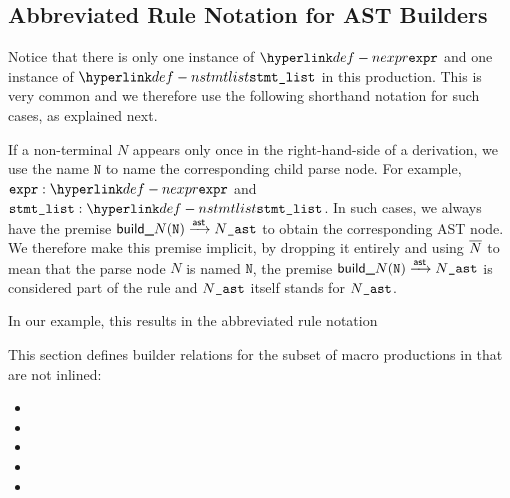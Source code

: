 \subsection{Abbreviated Rule Notation for AST Builders}
Notice that there is only one instance of $\Nexpr$ and one instance of $\Nstmtlist$ in this production.
This is very common and we therefore use the following shorthand notation for such cases, as explained next.

If a non-terminal $N$ appears only once in the right-hand-side of a derivation,
we use the name $\texttt{N}$ to name the corresponding child parse node.
For example, $\namednode{\vexpr}{\Nexpr}$ and $\namednode{\vstmtlist}{\Nstmtlist}$.
In such cases, we always have the premise $\textsf{build\_}N(\texttt{N}) \xrightarrow{\textsf{ast}} N\texttt{\_ast}$
to obtain the corresponding AST node.
We therefore make this premise implicit, by dropping it entirely and using $\overline{{N}}$ to mean that
the parse node $N$ is named $\texttt{N}$, the premise $\textsf{build\_}N(\texttt{N}) \xrightarrow{\textsf{ast}} N\texttt{\_ast}$
is considered part of the rule and $N\texttt{\_ast}$ itself stands for $N\texttt{\_ast}$.

In our example, this results in the abbreviated rule notation
\begin{mathpar}
\end{mathpar}

This section defines builder relations for the
subset of macro productions in 
that are not inlined:
\begin{itemize}
  \item {}
  \item {}
  \item {}
  \item {}
  \item {}
\end{itemize}

